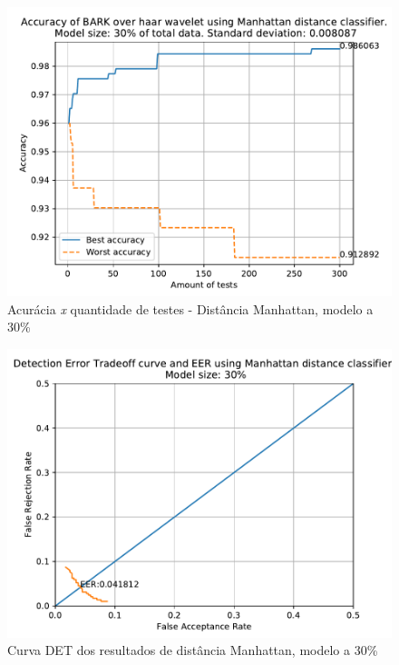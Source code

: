 			\begin{figure}[H]
				\centering
				\includegraphics[width=.9\linewidth]{images/results/confusionMatrices/classifier_Manhattan_30}
				\caption{Acurácia \textit{x} quantidade de testes - Distância Manhattan, modelo a 30\%}
				\label{fig:classifiermanhattan30}
			\end{figure}
		
			\begin{figure}[H]
				\centering
				\includegraphics[width=.9\linewidth]{images/results/det/DET_for_classifier_Manhattan_30}
				\caption{Curva DET dos resultados de distância Manhattan, modelo a 30\%}
				\label{fig:detforclassifiermanhattan30}
			\end{figure}


